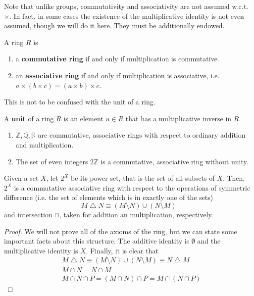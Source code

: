   Note that unlike groups, commutativity and associativity are not assumed w.r.t. $\times$. In fact, in some cases the existence of the multiplicative identity is not even assumed, though we will do it here. They must be additionally endowed. 

  \begin{definition}
    A ring $R$ is 
    \begin{enumerate}
      \item a \textbf{commutative ring} if and only if multiplication is commutative. 
      \item an \textbf{associative ring} if and only if multiplication is associative, i.e. $a \times (b \times c) = (a \times b) \times c$. 
    \end{enumerate}
  \end{definition}

  This is not to be confused with the unit of a ring. 

  \begin{definition}[Unit]
    A \textbf{unit} of a ring $R$ is an element $u \in R$ that has a multiplicative inverse in $R$. 
  \end{definition}

  \begin{example} 
    \begin{enumerate}
      \item $\mathbb{Z}, \mathbb{Q}, \mathbb{R}$ are commutative, associative rings with respect to ordinary addition and multiplication.
      \item The set of even integers $2\mathbb{Z}$ is a commutative, associative ring without unity.
    \end{enumerate}
  \end{example}

  \begin{proposition}
    Given a set $X$, let $2^X$ be its power set, that is the set of all subsets of $X$. Then, $2^X$ is a commutative associative ring with respect to the operations of symmetric difference (i.e. the set of elements which is in exactly one of the sets) 
    \begin{equation}
      M \bigtriangleup N \equiv (M \setminus N) \cup (N \setminus M)
    \end{equation}
    and intersection $\cap$, taken for addition an multiplication, respectively. 
  \end{proposition}
  \begin{proof}
    We will not prove all of the axioms of the ring, but we can state some important facts about this structure. The additive identity is $\emptyset$ and the multiplicative identity is $X$. Finally, it is clear that 
    \begin{align*}
      & M \bigtriangleup N \equiv (M \setminus N) \cup (N \setminus M) \equiv N \bigtriangleup M \\
      & M \cap N = N \cap M \\
      & M \cap N \cap P = (M \cap N) \cap P = M \cap (N \cap P)
    \end{align*}
  \end{proof}


